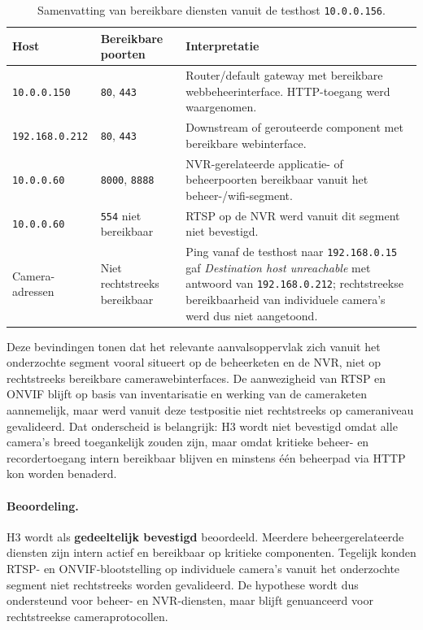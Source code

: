 \begin{table}[htbp]
    \centering
    \small
    \caption[Samenvatting van bereikbare diensten tijdens de validatie]{Samenvatting van bereikbare diensten vanuit de testhost \texttt{10.0.0.156}.}
    \label{tab:validatie-poorten}
    \begin{tabular}{p{}p{}p{}}
        \hline
        \textbf{Host} & \textbf{Bereikbare poorten} & \textbf{Interpretatie} \\
        \hline
        \texttt{10.0.0.150} & \texttt{80}, \texttt{443} & Router/default gateway met bereikbare webbeheerinterface. HTTP-toegang werd waargenomen. \\
        \texttt{192.168.0.212} & \texttt{80}, \texttt{443} & Downstream of gerouteerde component met bereikbare webinterface. \\
        \texttt{10.0.0.60} & \texttt{8000}, \texttt{8888} & NVR-gerelateerde applicatie- of beheerpoorten bereikbaar vanuit het beheer-/wifi-segment. \\
        \texttt{10.0.0.60} & \texttt{554} niet bereikbaar & RTSP op de NVR werd vanuit dit segment niet bevestigd. \\
       Camera-adressen &
       Niet rechtstreeks bereikbaar &
       Ping vanaf de testhost naar \texttt{192.168.0.15} gaf \textit{Destination host unreachable} met antwoord van \texttt{192.168.0.212}; rechtstreekse bereikbaarheid van individuele camera's werd dus niet aangetoond. \\
        \hline
    \end{tabular}
\end{table}

Deze bevindingen tonen dat het relevante aanvalsoppervlak zich vanuit het onderzochte segment vooral situeert op de beheerketen en de NVR, niet op rechtstreeks bereikbare camerawebinterfaces. De aanwezigheid van RTSP en ONVIF blijft op basis van inventarisatie en werking van de cameraketen aannemelijk, maar werd vanuit deze testpositie niet rechtstreeks op cameraniveau gevalideerd. Dat onderscheid is belangrijk: H3 wordt niet bevestigd omdat alle camera's breed toegankelijk zouden zijn, maar omdat kritieke beheer- en recordertoegang intern bereikbaar blijven en minstens één beheerpad via HTTP kon worden benaderd.

\paragraph{Beoordeling.}
H3 wordt als \textbf{gedeeltelijk bevestigd} beoordeeld. Meerdere beheergerelateerde diensten zijn intern actief en bereikbaar op kritieke componenten. Tegelijk konden RTSP- en ONVIF-blootstelling op individuele camera's vanuit het onderzochte segment niet rechtstreeks worden gevalideerd. De hypothese wordt dus ondersteund voor beheer- en NVR-diensten, maar blijft genuanceerd voor rechtstreekse cameraprotocollen.


